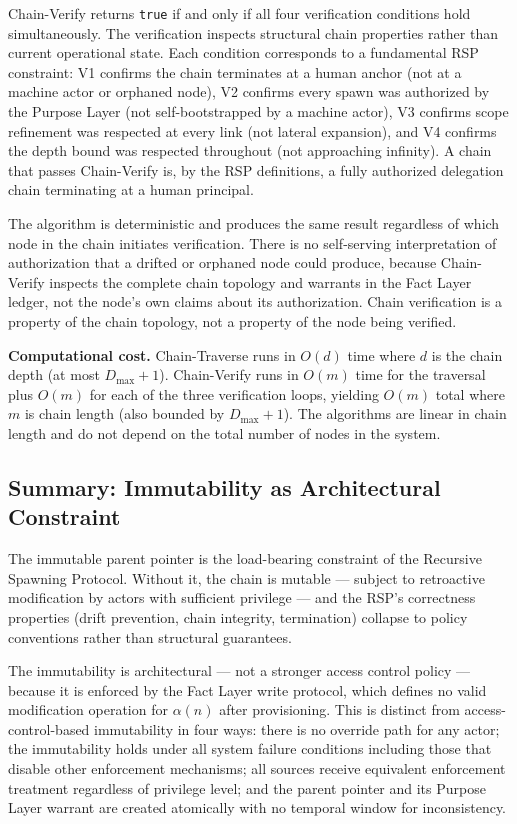Chain-Verify returns \texttt{true} if and only if all four verification conditions hold simultaneously. The verification inspects structural chain properties rather than current operational state. Each condition corresponds to a fundamental RSP constraint: V1 confirms the chain terminates at a human anchor (not at a machine actor or orphaned node), V2 confirms every spawn was authorized by the Purpose Layer (not self-bootstrapped by a machine actor), V3 confirms scope refinement was respected at every link (not lateral expansion), and V4 confirms the depth bound was respected throughout (not approaching infinity). A chain that passes Chain-Verify is, by the RSP definitions, a fully authorized delegation chain terminating at a human principal.

The algorithm is deterministic and produces the same result regardless of which node in the chain initiates verification. There is no self-serving interpretation of authorization that a drifted or orphaned node could produce, because Chain-Verify inspects the complete chain topology and warrants in the Fact Layer ledger, not the node's own claims about its authorization. Chain verification is a property of the chain topology, not a property of the node being verified.

\bigskip
\noindent\textbf{Computational cost.} Chain-Traverse runs in $O(d)$ time where $d$ is the chain depth (at most $D_{\max} + 1$). Chain-Verify runs in $O(m)$ time for the traversal plus $O(m)$ for each of the three verification loops, yielding $O(m)$ total where $m$ is chain length (also bounded by $D_{\max} + 1$). The algorithms are linear in chain length and do not depend on the total number of nodes in the system.

\subsection{Summary: Immutability as Architectural Constraint}
\label{sec:immutability-summary}

The immutable parent pointer is the load-bearing constraint of the Recursive Spawning Protocol. Without it, the chain is mutable --- subject to retroactive modification by actors with sufficient privilege --- and the RSP's correctness properties (drift prevention, chain integrity, termination) collapse to policy conventions rather than structural guarantees.

The immutability is architectural --- not a stronger access control policy --- because it is enforced by the Fact Layer write protocol, which defines no valid modification operation for $\alpha(n)$ after provisioning. This is distinct from access-control-based immutability in four ways: there is no override path for any actor; the immutability holds under all system failure conditions including those that disable other enforcement mechanisms; all sources receive equivalent enforcement treatment regardless of privilege level; and the parent pointer and its Purpose Layer warrant are created atomically with no temporal window for inconsistency.

